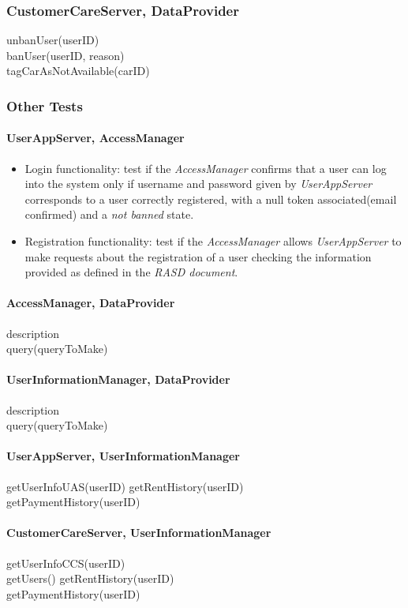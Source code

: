 \subsubsection{CustomerCareServer, DataProvider}
unbanUser(userID)\\
banUser(userID, reason)\\
tagCarAsNotAvailable(carID) \\

\subsubsection{Other Tests}

\paragraph{UserAppServer, AccessManager}
\begin{itemize}
\item Login functionality: test if the \emph{AccessManager} confirms that a user can log into the system only if username and password given by \emph{UserAppServer} corresponds to a user correctly registered, with a null token associated(email confirmed) and a \emph{not banned} state.
\item Registration functionality: test if the \emph{AccessManager} allows \emph{UserAppServer} to make requests about the registration of a user checking the information provided as defined in the \emph{RASD document}\cite{RASD}.
\end{itemize}



\paragraph{AccessManager, DataProvider} 
description \\
query(queryToMake)

\paragraph{UserInformationManager, DataProvider} 
description \\
query(queryToMake)

\paragraph{UserAppServer, UserInformationManager}
getUserInfoUAS(userID)
getRentHistory(userID) \\
getPaymentHistory(userID) \\

\paragraph{CustomerCareServer, UserInformationManager}
getUserInfoCCS(userID) \\
getUsers()
getRentHistory(userID) \\
getPaymentHistory(userID) \\










